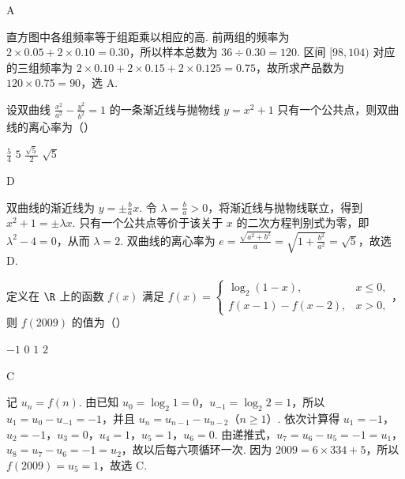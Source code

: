 \begin{answer}
A
\end{answer}

\begin{solution}
直方图中各组频率等于组距乘以相应的高. 前两组的频率为 \(2\times0.05+2\times0.10=0.30\)，所以样本总数为 \(36\div0.30=120\). 区间 \([98,104)\) 对应的三组频率为 \(2\times0.10+2\times0.15+2\times0.125=0.75\)，故所求产品数为 \(120\times0.75=90\)，选 A.
\end{solution}

\begin{problem}
设双曲线 \(\frac{x^2}{a^2} - \frac{y^2}{b^2} = 1\) 的一条渐近线与抛物线 \(y = x^2 + 1\) 只有一个公共点，则双曲线的离心率为（\quad）

\choices
    {\(\frac{5}{4}\)}
    {\(5\)}
    {\( \frac{\sqrt{5}}{2} \)}
    {\(\sqrt{5}\)}
\end{problem}

\begin{answer}
D
\end{answer}

\begin{solution}
双曲线的渐近线为 \(y=\pm\frac{b}{a}x\). 令 \(\lambda=\frac{b}{a}>0\)，将渐近线与抛物线联立，得到 \(x^2+1=\pm\lambda x\). 只有一个公共点等价于该关于 \(x\) 的二次方程判别式为零，即 \(\lambda^2-4=0\)，从而 \(\lambda=2\). 双曲线的离心率为
\(\displaystyle e=\frac{\sqrt{a^2+b^2}}{a}=\sqrt{1+\frac{b^2}{a^2}}=\sqrt5\)，故选 D.
\end{solution}

\begin{problem}
定义在 \(\R\) 上的函数 \(f(x)\) 满足 \(f(x) = \begin{cases}
\log_2(1 - x), & x \leqslant 0,\\
f(x - 1) - f(x - 2), & x > 0,
\end{cases}\)，则 \(f(2009)\) 的值为（\quad）

\choices
    {\(-1\)}
    {\(0\)}
    {\(1\)}
    {\(2\)}
\end{problem}

\begin{answer}
C
\end{answer}

\begin{solution}
记 \(u_n=f(n)\). 由已知 \(u_0=\log_2 1=0\)，\(u_{-1}=\log_2 2=1\)，所以 \(u_1=u_0-u_{-1}=-1\)，并且 \(u_n=u_{n-1}-u_{n-2}\)（\(n\geqslant1\)）. 依次计算得
\(u_1=-1\)，\(u_2=-1\)，\(u_3=0\)，\(u_4=1\)，\(u_5=1\)，\(u_6=0\). 由递推式，\(u_7=u_6-u_5=-1=u_1\)，\(u_8=u_7-u_6=-1=u_2\)，故以后每六项循环一次. 因为 \(2009=6\times334+5\)，所以 \(f(2009)=u_5=1\)，故选 C.
\end{solution}

